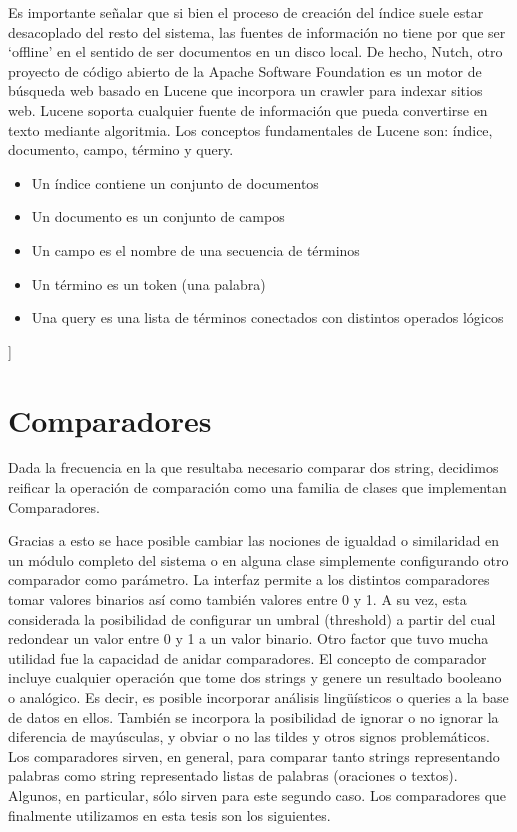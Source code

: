 Es importante señalar que si bien el proceso de creaci\'on del índice suele estar desacoplado del resto 
del sistema, las fuentes de informaci\'on no tiene por que ser `offline' en el sentido de ser documentos
en un disco local. De hecho, Nutch, otro proyecto de c\'odigo abierto de la Apache Software Foundation es 
un motor de búsqueda web basado en Lucene que incorpora un crawler para indexar sitios web. Lucene soporta 
cualquier fuente de informaci\'on que pueda convertirse en texto mediante algoritmia.
\newline
Los conceptos fundamentales de Lucene son: índice, documento, campo, término y query.
\begin{itemize}
\item Un índice contiene un conjunto de documentos
\item Un documento es un conjunto de campos
\item Un campo es el nombre de una secuencia de términos
\item Un término es un token (una palabra)
\item Una query es una lista de términos conectados con distintos operados l\'ogicos
\end{itemize}

\bigskip
[[Dar ejemplos de una query]]
\bigskip


\chapter{Comparadores}
\label{sec:comparadores}

Dada la frecuencia en la que resultaba necesario comparar dos string,
decidimos reificar la operación de comparación como una familia de
clases que implementan Comparadores. 


Gracias a esto se hace posible cambiar las nociones de igualdad o
similaridad en un módulo completo del sistema o en alguna clase
simplemente configurando otro comparador como parámetro. La
interfaz permite a los distintos comparadores tomar valores binarios
así como también valores entre 0 y 1. A su vez, esta considerada la
posibilidad de configurar un umbral (threshold) a partir del cual
redondear un valor entre 0 y 1 a un valor binario. Otro factor que tuvo
mucha utilidad fue la capacidad de anidar comparadores. 
El concepto de comparador incluye cualquier operación que tome dos
strings y genere un resultado booleano o analógico. Es decir, es posible 
incorporar análisis lingüísticos o queries a la base de datos en ellos.
También se incorpora la posibilidad de ignorar o no ignorar la diferencia de mayúsculas, 
y obviar o no las tildes y otros signos problemáticos. Los comparadores sirven,
en general, para comparar tanto strings representando palabras como
string representado listas de palabras (oraciones o textos). Algunos,
en particular, sólo sirven para este segundo caso. Los comparadores
que finalmente utilizamos en esta tesis son los siguientes.

